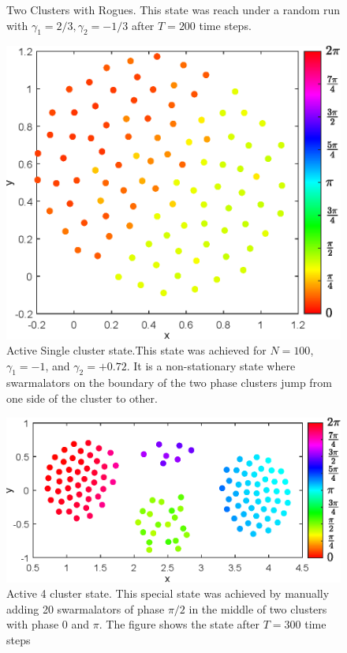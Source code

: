 \documentclass[superscriptaddress,reprint,amssymb, amsmath,aps, pre]{revtex4-1}
\begin{document}
{\begin{figure}
        \caption{Two Clusters with Rogues. This state was reach under a random run with \(\gamma_1 = 2/3,\gamma_2 = -1/3\) after \(T = 200 \) time steps.}
        \label{fig:twoClustersWithRogues}
    \end{figure}
    \begin{figure}
        \includegraphics[width = \linewidth]{ActiveSingle.eps}
        \caption{Active Single cluster state.This state was achieved for \(N = 100\), \(\gamma_1 = -1\), and \(\gamma_2 = +0.72\). It is a non-stationary state where swarmalators on the boundary of the two phase clusters jump from one side of the cluster to other.}
        \label{fig:ActiveSingle}
    \end{figure}
    \begin{figure}
        \includegraphics[width = \linewidth]{Active4Clust.eps}
        \caption{Active 4 cluster state. This special state was achieved by manually adding 20 swarmalators of phase \(\pi/2\) in the middle of two clusters with phase \(0\) and \(\pi\). The figure shows the state after \(T = 300\) time steps}
        \label{fig:Active4Clust}
    \end{figure}
}
\end{document}
